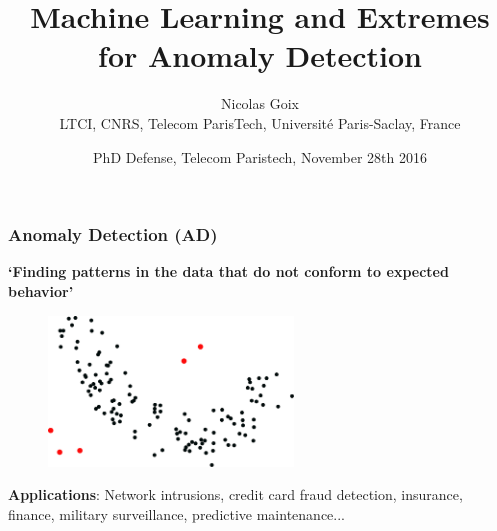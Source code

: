 \documentclass[9pt]{beamer}
\title{
Machine Learning and Extremes  for Anomaly Detection
}
\author[Nicolas Goix]{ Nicolas Goix \\
 {\tiny LTCI, CNRS, Telecom ParisTech, Université Paris-Saclay, France 
 }
}
\date{PhD Defense, Telecom Paristech, November 28th 2016}
\begin{document}
\begin{frame}
 \titlepage
\end{frame}







\begin{frame}
\frametitle{Anomaly Detection (AD)}

\textbf{`Finding patterns in the data that do not conform to expected behavior'}
\begin{figure}
\includegraphics[height=4cm]{sourcefigs/AD_intro.pdf}
\end{figure}
\textbf{Applications}: Network intrusions, credit card fraud detection, insurance, finance, military surveillance, predictive maintenance... \\~\\
\end{frame}
\end{document}
